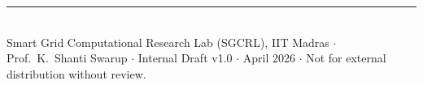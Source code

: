 \documentclass[11pt, a4paper]{article}
\begin{document}
\vspace{6mm}
\noindent\textcolor{slate}{\rule{\linewidth}{0.3pt}}\\[3pt]
{\small\textcolor{slate}{%
  Smart Grid Computational Research Lab (SGCRL), IIT Madras $\cdot$ Prof.\ K.\ Shanti Swarup $\cdot$
  Internal Draft v1.0 $\cdot$ April 2026 $\cdot$
  Not for external distribution without review.%
}}
\end{document}
